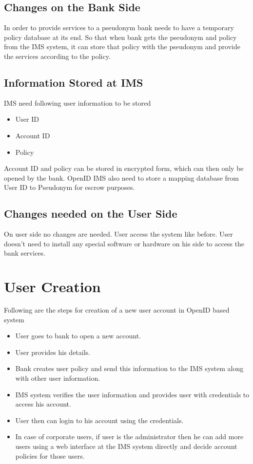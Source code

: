 \subsection{Changes on the Bank Side}
In order to provide services to a pseudonym bank needs to have a temporary policy database at its end. So that when bank gets the pseudonym and policy from the IMS system, it can store that policy with the pseudonym and provide the services according to the policy.
\subsection{Information Stored at IMS}
IMS need following user information to be stored
\begin{itemize}
	\item User ID
	\item Account ID
	\item Policy
\end{itemize}
Account ID and policy can be stored in encrypted form, which can then only be opened by the bank. OpenID IMS also need to store a mapping database from User ID to Pseudonym for escrow purposes.
\subsection{Changes needed on the User Side}
On user side no changes are needed. User access the system like before. User doesn't need to install any special software or hardware on his side to access the bank services. 
\section{User Creation}
Following are the steps for creation of a new user account in OpenID based system
\begin{itemize}
	\item User goes to bank to open a new account.
	\item User provides his details.
	\item Bank creates user policy and send this information to the IMS system along with other user information.
	\item IMS system verifies the user information and provides user with credentials to access his account.
	\item User then can login to his account using the credentials.
	\item In case of corporate users, if user is the administrator then he can add more users using a web interface at the IMS system directly and decide account policies for those users.
\end{itemize}
